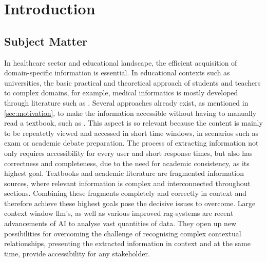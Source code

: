 \chapter{Introduction}\label{ch:introduction}
\section{Subject Matter}\label{sec:subject matter}
In healthcare sector and educational landscape, the efficient acquisition of domain-specific information is essential. 
In educational contexts such as universities, the basic practical and theoretical approach of students and teachers to complex domains, for example, medical informatics is mostly developed through literature such as \citet{bb2}.
%
Several approaches already exist, as mentioned in \cref{sec:motivation}, to make the information accessible without having to manually read a textbook, such as \citet{bb2}.
This aspect is so relevant because the content is mainly to be repeatetly viewed and accessed in short time windows, in scenarios such as exam or academic debate preparation. 
%
The process of extracting information not only requires accessibility for every user and short response times, but also has correctness and completeness, due to the need for academic consistency, as its highest goal. 
Textbooks and academic literature are fragmented information sources, where relevant information is complex and interconnected throughout sections. 
Combining these fragments completely and correctly in context and therefore achieve these highest goals pose the decisive issues to overcome. 
%
Large context window \ac{llm}'s, as well as various improved \ac{rag}-systems are recent advancements of AI to analyse vast quantities of data.
They open up new possibilities for overcoming the challenge of recognising complex contextual relationships, presenting the extracted information in context and at the same time, provide accessibility for any stakeholder.

